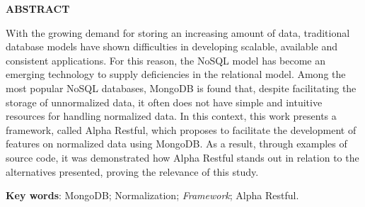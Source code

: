\vfill
\begin{center}
{\textbf{ABSTRACT}\\}
\end{center}

\noindent

With the growing demand for storing an increasing amount of data, traditional database models have shown difficulties in developing scalable, available and consistent applications. For this reason, the NoSQL model has become an emerging technology to supply deficiencies in the relational model. Among the most popular NoSQL databases, MongoDB is found that, despite facilitating the storage of unnormalized data, it often does not have simple and intuitive resources for handling normalized data. In this context, this work presents a framework, called Alpha Restful, which proposes to facilitate the development of features on normalized data using MongoDB. As a result, through examples of source code, it was demonstrated how Alpha Restful stands out in relation to the alternatives presented, proving the relevance of this study.
 
 \vspace{\onelineskip}
    
 \noindent
 \textbf{Key words}: MongoDB; Normalization; \textit{Framework}; Alpha Restful.
